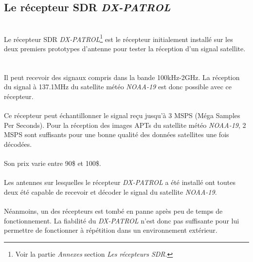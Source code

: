 \documentclass[12pt,fleqn]{book} %
\begin{document}
\subsection{Le récepteur SDR \emph{DX-PATROL}}
~\\Le récepteur SDR \emph{DX-PATROL}\footnote{Voir la partie \emph{Annexes} section \emph{Les récepteurs SDR}.} est le récepteur initialement installé sur les deux premiers prototypes d'antenne pour tester la réception d'un signal satellite. 
~\\\\Il peut recevoir des signaux compris dans la bande 100kHz-2GHz. La réception du signal à 137.1MHz du satellite météo \emph{NOAA-19} est donc possible avec ce récepteur. 
~\\\\Ce récepteur peut échantillonner le signal reçu jusqu'à 3 MSPS (Méga Samples Per Seconds). Pour la réception des images APTs du satellite météo \emph{NOAA-19}, 2 MSPS sont suffisants pour une bonne qualité des données satellites une fois décodées.
~\\\\Son prix varie entre 90\$ et 100\$.
~\\\\Les antennes sur lesquelles le récepteur \emph{DX-PATROL} a été installé ont toutes deux été capable de recevoir et décoder le signal du satellite \emph{NOAA-19}.
~\\\\Néanmoins, un des récepteurs est tombé en panne après peu de temps de fonctionnement. La fiabilité du \emph{DX-PATROL} n'est donc pas suffisante pour lui permettre de fonctionner à répétition dans un environnement extérieur.
\end{document}
